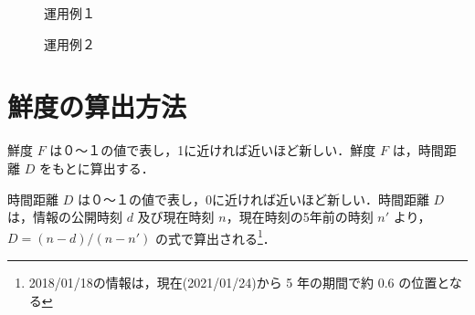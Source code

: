 \begin{figure}[htbp]
  \begin{minipage}{0.5\hsize}
    \begin{center}
    \end{center}
    \caption{運用例１}
  \end{minipage}
  \begin{minipage}{0.5\hsize}
    \begin{center}
    \end{center}
    \caption{運用例２}
  \end{minipage}
\end{figure}

\section{鮮度の算出方法}
\label{sec:imp_calculation}

鮮度 $F$ は０～１の値で表し，1に近ければ近いほど新しい．鮮度 $F$ は，時間距離 $D$ をもとに算出する．

時間距離 $D$ は０～１の値で表し，0に近ければ近いほど新しい．時間距離 $D$ は，情報の公開時刻 $d$ 及び現在時刻 $n$，現在時刻の5年前の時刻 $n'$ より，$ D =  (n - d) / (n - n') $ の式で算出される\footnote{2018/01/18の情報は，現在(2021/01/24)から 5 年の期間で約 0.6 の位置となる}．

